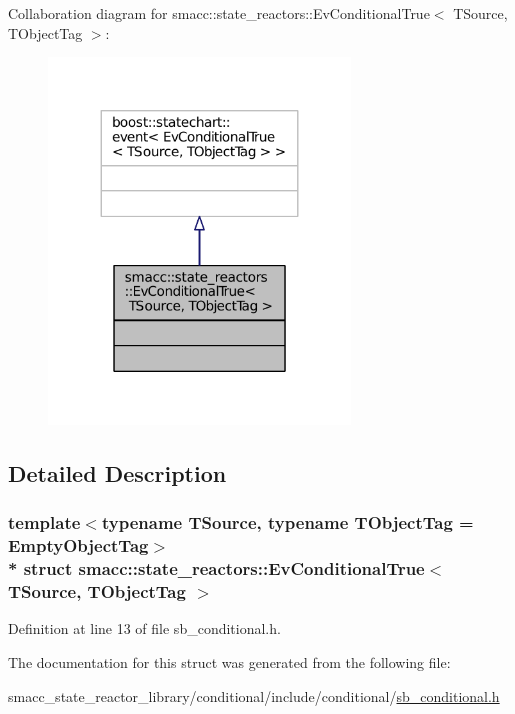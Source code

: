 Collaboration diagram for smacc\+:\+:state\+\_\+reactors\+:\+:Ev\+Conditional\+True$<$ T\+Source, T\+Object\+Tag $>$\+:
\nopagebreak
\begin{figure}[H]
\begin{center}
\leavevmode
\includegraphics[width=227pt]{structsmacc_1_1state__reactors_1_1EvConditionalTrue__coll__graph}
\end{center}
\end{figure}


\subsection{Detailed Description}
\subsubsection*{template$<$typename T\+Source, typename T\+Object\+Tag = Empty\+Object\+Tag$>$\\*
struct smacc\+::state\+\_\+reactors\+::\+Ev\+Conditional\+True$<$ T\+Source, T\+Object\+Tag $>$}



Definition at line 13 of file sb\+\_\+conditional.\+h.



The documentation for this struct was generated from the following file\+:\begin{DoxyCompactItemize}
\item 
smacc\+\_\+state\+\_\+reactor\+\_\+library/conditional/include/conditional/\hyperlink{sb__conditional_8h}{sb\+\_\+conditional.\+h}\end{DoxyCompactItemize}
